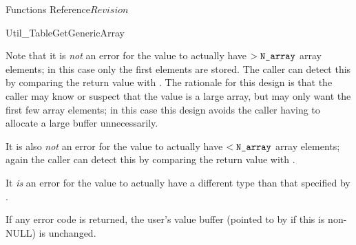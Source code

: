 \begin{cactuspart}{ Functions Reference}{}{$Revision$}
\begin{FunctionDescription}{Util\_TableGetGenericArray}
\begin{Discussion}
Note that it is {\em not\/} an error for the value to actually have
$> \texttt{N\_array}$ array elements; in this case only the first 
elements are stored.  The caller can detect this by comparing the
return value with .
The rationale for this design is that the caller may know or suspect
that the value is a large array, but may only want the first few array
elements; in this case this design avoids the caller having to allocate
a large buffer unnecessarily.

It is also {\em not\/} an error for the value to actually have
$< \texttt{N\_array}$ array elements; again the caller can detect this by
comparing the return value with .

It {\em is\/} an error for the value to actually have a different type
than that specified by .

If any error code is returned, the user's value buffer
(pointed to by  if this is non-NULL) is unchanged.
\end{Discussion}


\end{FunctionDescription}
\end{cactuspart}
